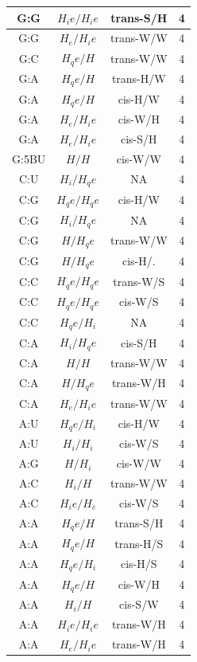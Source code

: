 \begin{center}
\begin{longtable}{c|c|c|c}
G:G & $H_ie/H_ie$ & trans-S/H & 4 \\  \hline
G:G & $H_e/H_ie$ & trans-W/W & 4 \\  \hline
G:C & $H_qe/H$ & trans-W/W & 4 \\  \hline
G:A & $H_qe/H$ & trans-H/W & 4 \\  \hline
G:A & $H_qe/H$ & cis-H/W & 4 \\  \hline
G:A & $H_e/H_ie$ & cis-W/H & 4 \\  \hline
G:A & $H_e/H_ie$ & cis-S/H & 4 \\  \hline
G:5BU & $H/H$ & cis-W/W & 4 \\  \hline
C:U & $H_i/H_qe$ & NA & 4 \\  \hline
C:G & $H_qe/H_qe$ & cis-H/W & 4 \\  \hline
C:G & $H_i/H_qe$ & NA & 4 \\  \hline
C:G & $H/H_qe$ & trans-W/W & 4 \\  \hline
C:G & $H/H_qe$ & cis-H/. & 4 \\  \hline
C:C & $H_qe/H_qe$ & trans-W/S & 4 \\  \hline
C:C & $H_qe/H_qe$ & cis-W/S & 4 \\  \hline
C:C & $H_qe/H_i$ & NA & 4 \\  \hline
C:A & $H_i/H_qe$ & cis-S/H & 4 \\  \hline
C:A & $H/H$ & trans-W/W & 4 \\  \hline
C:A & $H/H_qe$ & trans-W/H & 4 \\  \hline
C:A & $H_e/H_ie$ & trans-W/W & 4 \\  \hline
A:U & $H_qe/H_i$ & cis-H/W & 4 \\  \hline
A:U & $H_i/H_i$ & cis-W/S & 4 \\  \hline
A:G & $H/H_i$ & cis-W/W & 4 \\  \hline
A:C & $H_i/H$ & trans-W/W & 4 \\  \hline
A:C & $H_ie/H_e$ & cis-W/S & 4 \\  \hline
A:A & $H_qe/H$ & trans-S/H & 4 \\  \hline
A:A & $H_qe/H$ & trans-H/S & 4 \\  \hline
A:A & $H_qe/H_i$ & cis-H/S & 4 \\  \hline
A:A & $H_qe/H$ & cis-W/H & 4 \\  \hline
A:A & $H_i/H$ & cis-S/W & 4 \\  \hline
A:A & $H_ie/H_ie$ & trans-W/H & 4 \\  \hline
A:A & $H_e/H_ie$ & trans-W/H & 4 \\  \hline

\end{longtable}
\end{center}
